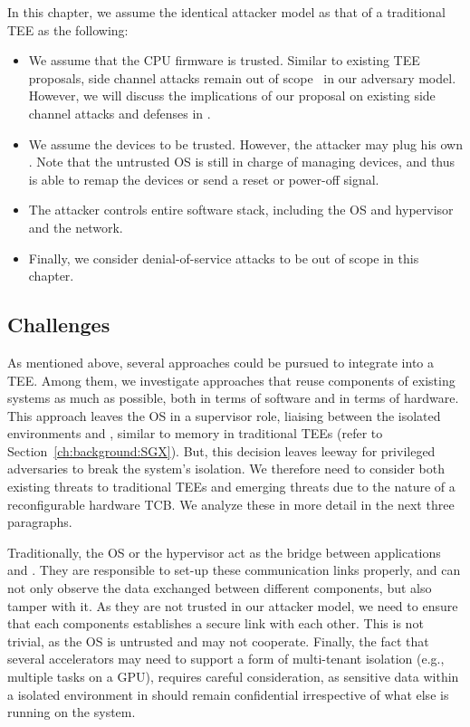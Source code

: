 In this chapter, we assume the identical attacker model as that of a traditional TEE as the following:

\begin{itemize}
  \item We assume that the CPU firmware is trusted. Similar to existing TEE proposals, side channel attacks remain out of scope~\cite{costan2016intel} in our adversary model. However, we will discuss the implications of our proposal on existing side channel attacks and defenses in . 
  
  \item We assume the \sphw devices to be trusted. However, the attacker may plug his own \sphw. Note that the untrusted OS is still in charge of managing \sphw devices, and thus is able to remap the devices or send a reset or power-off signal.
  
  \item  The attacker controls entire software stack, including the OS and hypervisor and the network.
   
  \item Finally, we consider denial-of-service attacks to be out of scope in this chapter. 
\end{itemize}



\subsection{Challenges}
\label{pue:sec:problemStatement:challenges}

As mentioned above, several approaches could be pursued to integrate \sphw into a TEE. Among them, we investigate approaches that reuse components of existing systems as much as possible, both in terms of software and in terms of hardware.  
This approach leaves the OS in a supervisor role, liaising between the isolated environments and \sphw, similar to memory in traditional TEEs (refer to  Section~\ref{ch:background:SGX}). But, this decision leaves leeway for privileged adversaries to break the system's isolation. We therefore need to consider both existing threats to traditional TEEs and emerging threats due to the nature of a reconfigurable hardware TCB. 
We analyze these in more detail in the next three paragraphs.


Traditionally, the OS or the hypervisor act as the bridge between applications and \sphw. They are responsible to set-up these communication links properly, and can not only observe the data exchanged between different components, but also tamper with it. As they are not trusted in our attacker model, we need to ensure that each components establishes a secure link with each other. This is not trivial, as the OS is untrusted and may not cooperate. 
Finally, the fact that several accelerators may need to support a form of multi-tenant isolation (e.g., multiple tasks on a GPU), requires careful consideration, as sensitive data within a isolated environment in \name should remain confidential irrespective of what else is running on the system.



